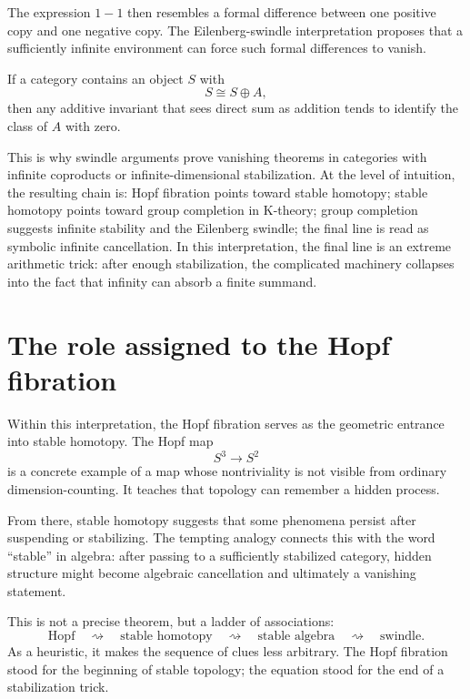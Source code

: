 The expression \(1-1\) then resembles a formal difference between one positive copy and one negative copy.  The Eilenberg-swindle interpretation proposes that a sufficiently infinite environment can force such formal differences to vanish.

\begin{proposition}
If a category contains an object \(S\) with
\[
  S\cong S\oplus A,
\]
then any additive invariant that sees direct sum as addition tends to identify the class of \(A\) with zero.
\end{proposition}

This is why swindle arguments prove vanishing theorems in categories with infinite coproducts or infinite-dimensional stabilization.  At the level of intuition, the resulting chain is: Hopf fibration points toward stable homotopy; stable homotopy points toward group completion in K-theory; group completion suggests infinite stability and the Eilenberg swindle; the final line is read as symbolic infinite cancellation.
In this interpretation, the final line is an extreme arithmetic trick: after enough stabilization, the complicated machinery collapses into the fact that infinity can absorb a finite summand.

\section{The role assigned to the Hopf fibration}

Within this interpretation, the Hopf fibration serves as the geometric entrance into stable homotopy.  The Hopf map
\[
  S^3\to S^2
\]
is a concrete example of a map whose nontriviality is not visible from ordinary dimension-counting.  It teaches that topology can remember a hidden process.

From there, stable homotopy suggests that some phenomena persist after suspending or stabilizing.  The tempting analogy connects this with the word ``stable'' in algebra: after passing to a sufficiently stabilized category, hidden structure might become algebraic cancellation and ultimately a vanishing statement.

This is not a precise theorem, but a ladder of associations:
\[
  \text{Hopf}\quad\rightsquigarrow\quad
  \text{stable homotopy}\quad\rightsquigarrow\quad
  \text{stable algebra}\quad\rightsquigarrow\quad
  \text{swindle}.
\]
As a heuristic, it makes the sequence of clues less arbitrary.  The Hopf fibration stood for the beginning of stable topology; the equation stood for the end of a stabilization trick.

